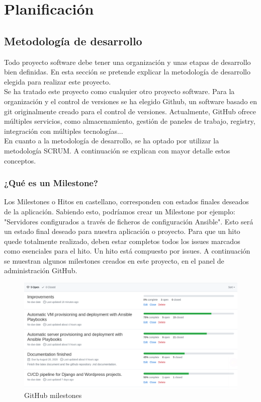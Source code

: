 \chapter {Planificación}

\section{Metodología de desarrollo}
\begin{text}
	Todo proyecto software debe tener una organización y unas etapas de desarrollo bien definidas. En esta sección se pretende explicar la metodología de desarrollo elegida para realizar este proyecto. \\
	Se ha tratado este proyecto como cualquier otro proyecto software. Para la organización y el control de versiones se ha elegido Github, un software basado en git originalmente creado para el control de versiones. Actualmente, GitHub ofrece múltiples servicios, como almacenamiento, gestión de paneles de trabajo, registry, integración con múltiples tecnologías... \\
	En cuanto a la metodología de desarrollo, se ha optado por utilizar la metodología SCRUM. A continuación se explican con mayor detalle estos conceptos.
\end{text}

\subsection{¿Qué es un Milestone?}
\label{milestones}
\begin{text}
	Los Milestones o Hitos en castellano, corresponden con estados finales deseados de la aplicación. Sabiendo esto, podríamos crear un Milestone por ejemplo: "Servidores configurados a través de ficheros de configuración Ansible". Esto será un estado final deseado para nuestra aplicación o proyecto. Para que un hito quede totalmente realizado, deben estar completos todos los issues marcados como esenciales para el hito. Un hito está compuesto por issues. A continuación se muestran algunos milestones creados en este proyecto, en el panel de administración GitHub.
	
	\begin{figure}[!hbt]
		\centering
		\includegraphics[scale=0.37]{imagenes/Analisis/milestones.png}
		\caption[GitHub milestones]{GitHub milestones \cite{github-issue}}
		\label{github_milestones}
	\end{figure}
\end{text}

